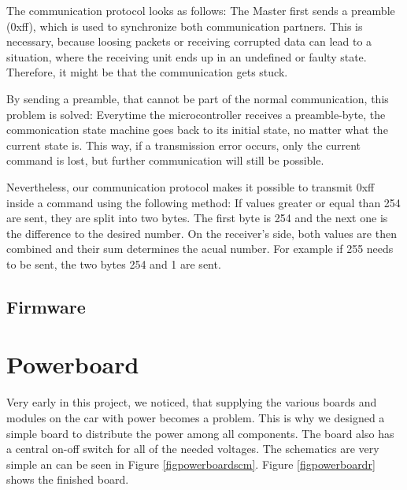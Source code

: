 \documentclass[12pt]{article}
\begin{document}
The communication protocol looks as follows:
The Master first sends a preamble (0xff), which is used to synchronize both communication partners.
This is necessary, because loosing packets or receiving corrupted data can lead to a situation, where the receiving unit ends up in an undefined or faulty state.
Therefore, it might be that the communication gets stuck.

By sending a preamble, that cannot be part of the normal communication, this problem is solved: Everytime the microcontroller receives a preamble-byte, the commonication state machine goes back to its initial state, no matter what the current state is.
This way, if a transmission error occurs, only the current command is lost, but further communication will still be possible.


Nevertheless, our communication protocol makes it possible to transmit 0xff inside a command using the following method:
If values greater or equal than 254 are sent, they are split into two bytes.
The first byte is 254 and the next one is the difference to the desired number.
On the receiver's side, both values are then combined and their sum determines the acual number. 
For example if 255 needs to be sent, the two bytes 254 and 1 are sent.

\subsection{Firmware}

\section{Powerboard}
Very early in this project, we noticed, that supplying the various boards and modules on the car with power becomes a problem.
This is why we designed a simple board to distribute the power among all components.
The board also has a central on-off switch for all of the needed voltages.
The schematics are very simple an can be seen in Figure \ref{figpowerboardscm}. Figure \ref{figpowerboardr} shows the finished board.
\end{document}
